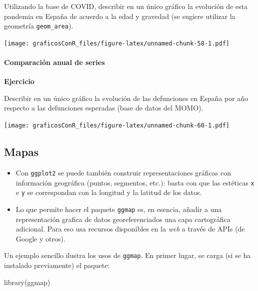 \documentclass[
]{article}
\newenvironment{Shaded}{\begin{snugshade}}{\end{snugshade}}
\newcommand{\FunctionTok}[1]{\textcolor[rgb]{0.00,0.00,0.00}{#1}}
\newcommand{\NormalTok}[1]{#1}
\newcounter{ejcnt}[section]
\numberwithin{ejcnt}{section}
\newenvironment{rien}{%
\begin{mdframed}[style=exampledefault]
}{\end{mdframed}}
\newenvironment{ej}[1][]{%
	\refstepcounter{ejcnt}%
	\par\medskip%
	\noindent%
	\textbf{Ejercicio \theejcnt \;\;}%
	\rmfamily%
}{\medskip}
\begin{document}
\begin{rien}
Utilizando la base de COVID, describir en un único gráfico la evolución
de esta pandemia en España de acuerdo a la edad y gravedad (se sugiere
utilizar la geometría \texttt{geom\_area}).
\end{rien}

\texttt{[image: graficosConR\_files/figure-latex/unnamed-chunk-58-1.pdf]}

\hypertarget{comparaciuxf3n-anual-de-series}{%
\paragraph{Comparación anual de series}\label{comparaciuxf3n-anual-de-series}}

\begin{ej}
Describir en un único gráfico la evolución de las defunciones en España
por año respecto a las defunciones esperadas (base de datos del MOMO).
\end{ej}

\texttt{[image: graficosConR\_files/figure-latex/unnamed-chunk-60-1.pdf]}

\hypertarget{mapas}{%
\subsection{Mapas}\label{mapas}}

\begin{itemize}
\item
  Con \texttt{ggplot2} se puede también construir representaciones gráficas con información geográfica (puntos, segmentos, etc.): basta con que las estéticas \texttt{x} e \texttt{y} se correspondan con la longitud y la latitud de los datos.
\item
  Lo que permite hacer el paquete \texttt{ggmap} es, en esencia, añadir a una representación grafica de datos georeferenciados una capa cartográfica adicional. Para eso usa recursos disponibles en la \emph{web} a través de APIs (de Google y otros).
\end{itemize}

Un ejemplo sencillo ilustra los usos de \texttt{ggmap}. En primer lugar, se carga (si se ha instalado previamente) el paquete:

\begin{Shaded}
\begin{Highlighting}[]
\FunctionTok{library}\NormalTok{(ggmap)}
\end{Highlighting}
\end{Shaded}
\end{document}
